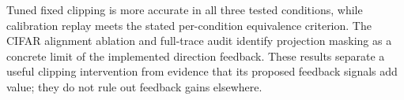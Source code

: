Tuned fixed clipping is more accurate in all three tested conditions, while
calibration replay meets the stated per-condition equivalence criterion.
The CIFAR alignment ablation and full-trace audit identify projection masking
as a concrete limit of the implemented direction feedback. These results
separate a useful clipping intervention from evidence that its proposed
feedback signals add value; they do not rule out feedback gains elsewhere.
